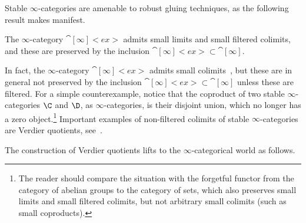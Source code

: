 \documentclass[a4paper]{amsart}
\begin{document}
Stable $\infty$-categories are amenable to robust gluing techniques, as the
following result makes manifest.

\begin{theorem}
  The $\infty$-category $\cat[\infty]<ex>$ admits small limits and small
  filtered colimits, and these are preserved by the inclusion
  ${\cat[\infty]<ex>\subset\cat[\infty]}$.
\end{theorem}

\begin{remark}
  In fact, the $\infty$-category $\cat[\infty]<ex>$ admits small
  colimits~\cite[Corollary~4.25]{BGT13}, but these are in general not preserved
  by the inclusion ${\cat[\infty]<ex>\subset\cat[\infty]}$ unless these are
  filtered. For a simple counterexample, notice that the coproduct of two stable
  $\infty$-categories $\C$ and $\D$, as $\infty$-categories, is their disjoint
  union, which no longer has a zero object.\footnote{The reader should compare
    the situation with the forgetful functor from the category of abelian groups
    to the category of sets, which also preserves small limits and small
    filtered colimits, but not arbitrary small colimits (such as small
    coproducts).} Important examples of non-filtered colimits of stable
  $\infty$-categories are Verdier quotients,
  see~.
\end{remark}

The construction of Verdier quotients lifts to the $\infty$-categorical world as
follows.
\end{document}
